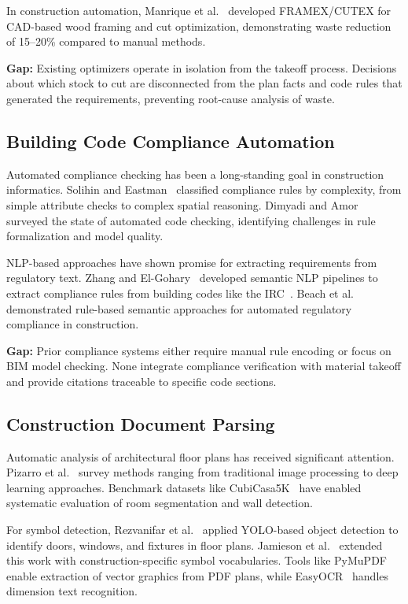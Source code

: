 In construction automation, Manrique et al.~\cite{manrique2007framex} developed FRAMEX/CUTEX for CAD-based wood framing and cut optimization, demonstrating waste reduction of 15--20\% compared to manual methods.

\textbf{Gap:} Existing optimizers operate in isolation from the takeoff process. Decisions about which stock to cut are disconnected from the plan facts and code rules that generated the requirements, preventing root-cause analysis of waste.

\subsection{Building Code Compliance Automation}

Automated compliance checking has been a long-standing goal in construction informatics.
Solihin and Eastman~\cite{solihin2017bim_compliance} classified compliance rules by complexity, from simple attribute checks to complex spatial reasoning.
Dimyadi and Amor~\cite{dimyadi2016automated_compliance} surveyed the state of automated code checking, identifying challenges in rule formalization and model quality.

NLP-based approaches have shown promise for extracting requirements from regulatory text.
Zhang and El-Gohary~\cite{zhang2023kg_codes, zhang2015code_nlp} developed semantic NLP pipelines to extract compliance rules from building codes like the IRC~\cite{irc2021}.
Beach et al.~\cite{beach2020irc_automation} demonstrated rule-based semantic approaches for automated regulatory compliance in construction.

\textbf{Gap:} Prior compliance systems either require manual rule encoding or focus on BIM model checking. None integrate compliance verification with material takeoff and provide citations traceable to specific code sections.

\subsection{Construction Document Parsing}

Automatic analysis of architectural floor plans has received significant attention.
Pizarro et al.~\cite{pizarro2022floorplan_survey} survey methods ranging from traditional image processing to deep learning approaches.
Benchmark datasets like CubiCasa5K~\cite{kalervo2019cubicasa5k} have enabled systematic evaluation of room segmentation and wall detection.

For symbol detection, Rezvanifar et al.~\cite{rezvanifar2020yolo_symbols} applied YOLO-based object detection to identify doors, windows, and fixtures in floor plans.
Jamieson et al.~\cite{jamieson2025symbol_detection} extended this work with construction-specific symbol vocabularies.
Tools like PyMuPDF~\cite{pymupdf2024} enable extraction of vector graphics from PDF plans, while EasyOCR~\cite{easyocr2024} handles dimension text recognition.

